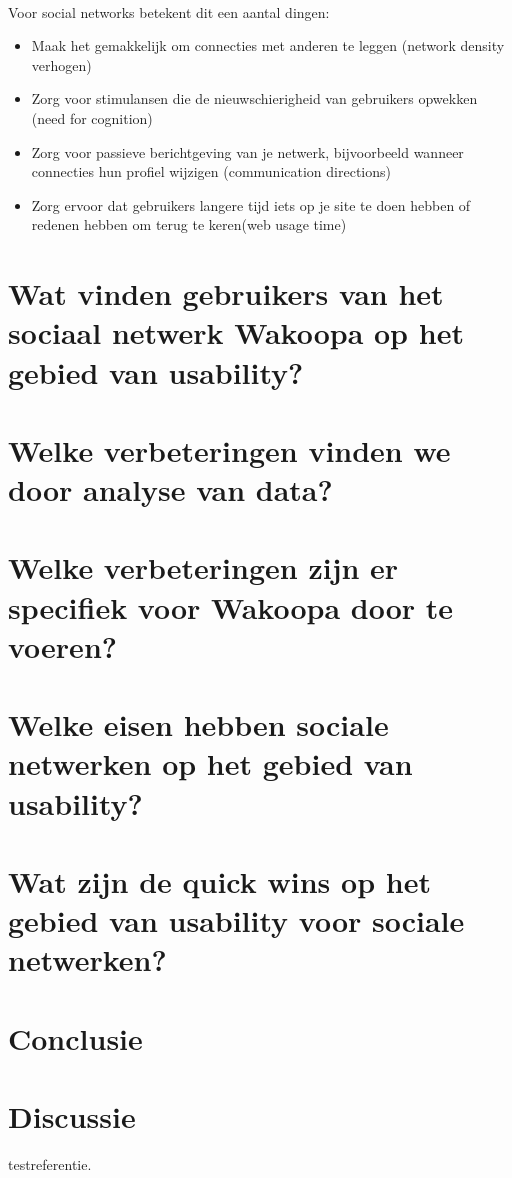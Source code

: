 \documentclass[a4paper, 10pt, pdftex]{article}
\begin{document}
        \paragraph{}
        Voor social networks betekent dit een aantal dingen:
        \begin{itemize}
          \item Maak het gemakkelijk om connecties met anderen te leggen (network density verhogen)
          \item Zorg voor stimulansen die de nieuwschierigheid van gebruikers opwekken (need for cognition)
          \item Zorg voor passieve berichtgeving van je netwerk, bijvoorbeeld wanneer connecties hun profiel wijzigen (communication directions)
          \item Zorg ervoor dat gebruikers langere tijd iets op je site te doen hebben of redenen hebben om terug te keren(web usage time)
        \end{itemize}

  \newpage
  \section{Wat vinden gebruikers van het sociaal netwerk Wakoopa op het gebied van usability?}

  \newpage
  \section{Welke verbeteringen vinden we door analyse van data?}
    \label{datachapter}
  \newpage
  \section{Welke verbeteringen zijn er specifiek voor Wakoopa door te voeren?}

  \newpage
  \section{Welke eisen hebben sociale netwerken op het gebied van usability?}

  \newpage
  \section{Wat zijn de quick wins op het gebied van usability voor sociale netwerken?}

  \newpage
  \section{Conclusie}

  \newpage
  \section{Discussie}

  testreferentie.\citep{Boyd2002} %

  
  
\end{document}
